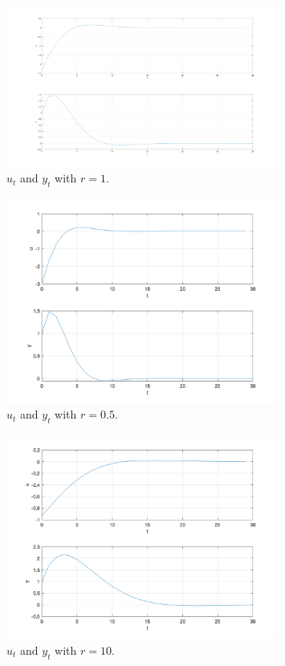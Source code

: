 \documentclass[11pt, a4paper, english]{NTNUoving}
\begin{document}
\begin{oppgave}
\begin{punkt}
        \begin{figure}[H]
            \centering
            \includegraphics[width=0.8\textwidth]{../1e_rd.png}
            \caption{$u_t$ and $y_t$ with $r=1$.}
            \label{fig:1e1}
        \end{figure}


        \begin{figure}[H]
            \centering
            \includegraphics[width=0.8\textwidth]{../1e_r1.png}
            \caption{$u_t$ and $y_t$ with $r=0.5$.}
            \label{fig:1e2}
        \end{figure}

        \begin{figure}[H]
            \centering
            \includegraphics[width=0.8\textwidth]{../1e_r2.png}
            \caption{$u_t$ and $y_t$ with $r=10$.}
            \label{fig:1e3}
        \end{figure}



\end{punkt}
\end{oppgave}
\end{document}
